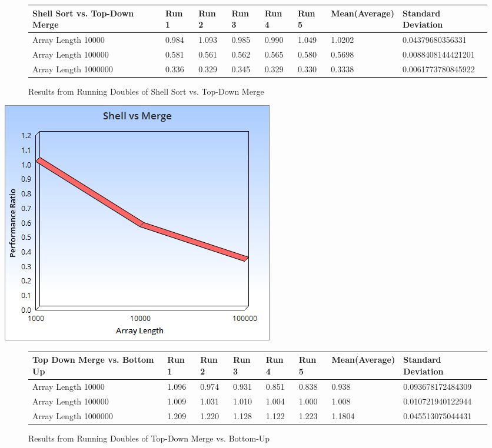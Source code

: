 \documentclass{article}
\begin{document}
\begin{figure}[H]
\centering
\begin{adjustwidth}{-3.4cm}{}
\begin{tabular}{| l | l | l | l | l | l | l | l |}
\hline
Shell Sort vs. Top-Down Merge & Run 1 & Run 2 & Run 3 & Run 4 & Run 5 & Mean(Average) & Standard Deviation\\ \hline
Array Length 10000 & 0.984 & 1.093 & 0.985 & 0.990 & 1.049 & 1.0202 & 0.04379680356331  \\ \hline
Array Length 100000 & 0.581 & 0.561 & 0.562 & 0.565 & 0.580 & 0.5698 & 0.0088408144421201 \\ \hline
Array Length 1000000 & 0.336 & 0.329 & 0.345 & 0.329 & 0.330 & 0.3338 & 0.0061773780845922  \\ \hline
\end{tabular}
\caption{Results from Running  Doubles  of Shell Sort vs. Top-Down Merge}
\end{adjustwidth}
\end{figure}
\includegraphics[scale=0.5]{Doubles3.png}




\begin{figure}[H]
\centering
\begin{adjustwidth}{-3.4cm}{}
\begin{tabular}{| l | l | l | l | l | l | l | l |}
\hline
Top Down Merge vs. Bottom Up & Run 1 & Run 2 & Run 3 & Run 4 & Run 5 & Mean(Average) & Standard Deviation\\ \hline
Array Length 10000 & 1.096 & 0.974 & 0.931 & 0.851 & 0.838 & 0.938 & 0.093678172484309 \\ \hline
Array Length 100000 & 1.009 & 1.031 & 1.010 & 1.004 & 1.000 & 1.008 & 0.010721940122944 \\ \hline
Array Length 1000000 & 1.209 & 1.220 & 1.128 & 1.122 & 1.223 & 1.1804 & 0.045513075044431  \\ \hline
\end{tabular}
\caption{Results from Running  Doubles of Top-Down Merge vs. Bottom-Up}
\end{adjustwidth}
\end{figure}
\end{document}
